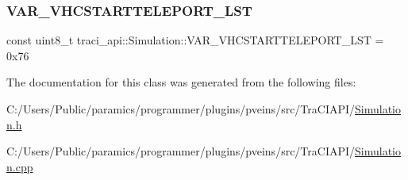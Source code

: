 \mbox{\label{classtraci__api_1_1_simulation_a143172fa14c4207f49e634c7b2624627}} 
\subsubsection{\texorpdfstring{V\+A\+R\+\_\+\+V\+H\+C\+S\+T\+A\+R\+T\+T\+E\+L\+E\+P\+O\+R\+T\+\_\+\+L\+ST}{VAR\_VHCSTARTTELEPORT\_LST}}
{\footnotesize\ttfamily const uint8\+\_\+t traci\+\_\+api\+::\+Simulation\+::\+V\+A\+R\+\_\+\+V\+H\+C\+S\+T\+A\+R\+T\+T\+E\+L\+E\+P\+O\+R\+T\+\_\+\+L\+ST = 0x76\hspace{0.3cm}{\ttfamily [static]}}



The documentation for this class was generated from the following files\+:\begin{DoxyCompactItemize}
\item 
C\+:/\+Users/\+Public/paramics/programmer/plugins/pveins/src/\+Tra\+C\+I\+A\+P\+I/\hyperlink{_simulation_8h}{Simulation.\+h}\item 
C\+:/\+Users/\+Public/paramics/programmer/plugins/pveins/src/\+Tra\+C\+I\+A\+P\+I/\hyperlink{_simulation_8cpp}{Simulation.\+cpp}\end{DoxyCompactItemize}
